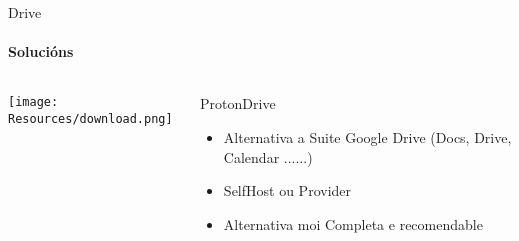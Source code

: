 \documentclass{beamer}
\begin{document}

\begin{frame}{Drive}
  \framesubtitle{Solucións}

  \begin{columns}
    \begin{column}{0.5\textwidth}
      \texttt{[image: Resources/download.png]}

      \vspace{1cm}


    \end{column}

    \begin{column}{0.4\textwidth}
      \begin{block}{ProtonDrive}
        \begin{itemize}
          \item Alternativa a Suite Google Drive (Docs, Drive, Calendar ......)
          \item SelfHost ou Provider
          \item Alternativa moi Completa e recomendable
        \end{itemize}
      \end{block}

    \end{column}

  \end{columns}


\end{frame}

\end{document}
